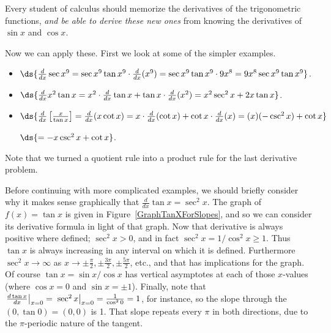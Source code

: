 Every student of calculus should memorize the derivatives of 
the trigonometric functions, {\it and be able to derive these
new ones} from knowing the derivatives of $\sin x$ and $\cos x$.


Now we can apply these.  First we look at some of the simpler examples.
\bex \qquad


\begin{itemize}
\item $\ds{\frac{d}{dx}\sec x^9=\sec x^9\tan x^9\cdot\frac{d}{dx}(x^9)
           =\sec x^9\tan x^9\cdot9x^8=9x^8\sec x^9\tan x^9}$.
\item
$\ds{\frac{d}{dx}x^2\tan x=x^2\cdot\frac{d}{dx}\tan x
              +\tan x\cdot\frac{d}{dx}(x^2)=x^2\sec^2x+2x\tan x}$.
\item $\ds{\frac{d}{dx}\left[\frac{x}{\tan x}\right]=\frac{d}{dx}(x\cot x)
=x\cdot\frac{d}{dx}(\cot x)+\cot x\cdot\frac{d}{dx}(x)
=(x)(-\csc^2x)+\cot x}$

$\ds{=-x\csc^2x+\cot x}$.
\end{itemize}\eex
Note that we turned a quotient rule into a product rule for the
last derivative problem.

Before continuing with more complicated examples, we should briefly
consider  why  it makes sense graphically that
$\frac{d}{dx}\tan x=\sec^2x$.
The graph of $f(x)=\tan x$ is given
in Figure~\ref{GraphTanXForSlopes}, and so we
can consider its derivative formula in light of that graph.
Now that derivative is always positive where defined;
$\sec^2x>0$, and in fact $\sec^2x=1/\cos^2x\ge1$.  Thus $\tan x$ is
always increasing in any interval on which it is defined.
Furthermore $\sec^2x\to\infty$ as $x\to\pm\frac{\pi}2,\pm\frac{3\pi}2,
\pm\frac{5\pi}2$, etc., and that has implications for the
graph.  Of course $\tan x=\sin x/\cos x$ has
vertical asymptotes at each of those $x$-values (where $\cos x=0$
and $\sin x=\pm 1$).  Finally, note that 
$\left.\frac{d\tan x}{dx}\right|_{x=0}=\left.\vphantom{\frac22}\sec^2x
\right|_{x=0}=\frac1{\cos^20}=1$, for instance, so the slope through 
the $(0,\tan0)=(0,0)$ is 1.  That slope repeats every $\pi$ in both 
directions, due to the $\pi$-periodic nature of the tangent. 

